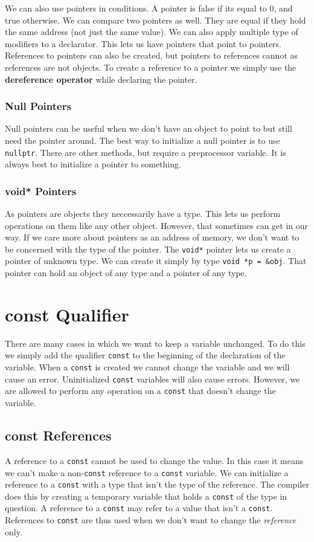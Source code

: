 \documentclass[12pt, a4paper]{report}
\begin{document}
\noindent We can also use pointers in conditions. A pointer is false if its equal to 0, and true otherwise. We can compare two pointers as well. They are equal if they hold the same address (not just the same value).
\newline We can also apply multiple type of modifiers to a declarator. This lets us have pointers that point to pointers. References to pointers can also be created, but pointers to references cannot as references are not objects. To create a reference to a pointer we simply use the \textbf{dereference operator} while declaring the pointer.
\subsubsection{Null Pointers}
Null pointers can be useful when we don't have an object to point to but still need the pointer around. The best way to initialize a null pointer is to use \verb|nullptr|. There are other methods, but require a preprocessor variable. It is always best to initialize a pointer to something.
\subsubsection{void* Pointers}
As pointers are objects they neccessarily have a type. This lets us perform operations on them like any other object. However, that sometimes can get in our way. If we care more about pointers as an address of memory, we don't want to be concerned with the type of the pointer.
The \verb|void*| pointer lets us create a pointer of unknown type. We can create it simply by type \verb|void *p = &obj|. That pointer can hold an object of any type and a pointer of any type.

\section{const Qualifier}
There are many cases in which we want to keep a variable unchanged. To do this we simply add the qualifier \verb|const| to the beginning of the declaration of the variable. When a \verb|const| is created we cannot change the variable and we will cause an error. Uninitialized \verb|const| variables will also cause errors. However, we are allowed to perform any operation on a \verb|const| that doesn't change the variable.
\subsection{const References}
A reference to a \verb|const| cannot be used to change the value. In this case it means we can't make a non-\verb|const| reference to a \verb|const| variable. We can initialize a reference to a \verb|const| with a type that isn't the type of the reference. The compiler does this by creating a temporary variable that holds a \verb|const| of the type in question. A reference to a \verb|const| may refer to a value that isn't a \verb|const|. References to \verb|const| are thus used when we don't want to change the \emph{reference} only.
\end{document}
